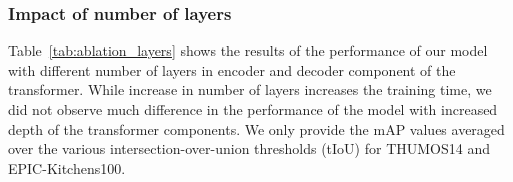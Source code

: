 \documentclass[10pt,twocolumn,letterpaper]{article}
\begin{document}
\subsubsection{Impact of number of layers}
\label{subsec:ablation_layers}
Table~\ref{tab:ablation_layers} shows the results of the performance of our model with different number of layers in encoder and decoder component of the transformer. While increase in number of layers increases the training time, we did not observe much difference in the performance of the model with increased depth of the transformer components. We only provide the mAP values averaged over the various intersection-over-union thresholds (tIoU) for THUMOS14 and EPIC-Kitchens100.
\setlength{\tabcolsep}{4pt}
\renewcommand{\arraystretch}{1}
\begin{table}[t]
\centering
\caption{\textbf{Impact of number of layers.} We report performance of our AGT model with different number of layers in encoder and decoder. We report mAP for evaluation performance (higher is better). EPIC (A), EPIC (V), EPIC (N) indicates task `Action', `Verb', `Noun' classification on EPIC-Kitchens100. \#E indicates number of layers in encoder and \#D indicates number of layers in decoder.}
\vspace{-1mm}
\label{tab:ablation_layers}
\end{table}
 
\end{document}
